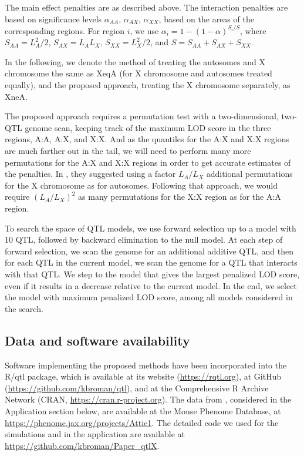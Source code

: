 \documentclass[12pt,letterpaper]{article}
\begin{document}
The main effect penalties are as described above. The interaction
penalties are based on significance levels $\alpha_{AA}$,
$\alpha_{AX}$, $\alpha_{XX}$, based on the areas of the corresponding
regions. For region $i$, we use $\alpha_i = 1 - (1-\alpha)^{S_i/S}$,
where $S_{AA} = L_A^2/2$, $S_{AX} = L_AL_X$, $S_{XX} = L_X^2/2$, and
$S = S_{AA} + S_{AX} + S_{XX}$.

In the following, we denote the method of \citet{Manichaikul2009}
treating the autosomes and X chromosome the same as XeqA (for X
chromosome and autosomes treated equally), and the proposed approach,
treating the X chromosome separately, as XneA.

The proposed approach requires a permutation test with a
two-dimensional, two-QTL genome scan, keeping track of the maximum LOD
score in the three regions, A:A, A:X, and X:X. And as the quantiles
for the A:X and X:X regions are much farther out in the tail, we will
need to perform many more permutations for the A:X and X:X regions in
order to get accurate estimates of the penalties. In
\citet{Broman2006}, they suggested using a factor $L_A/L_X$ additional
permutations for the X chromosome as for autosomes. Following that
approach, we would require $(L_A/L_X)^2$ as many permutations for the
X:X region as for the A:A region.

To search the space of QTL models, we use forward selection up to a
model with 10 QTL, followed by backward elimination to
the null model. At each step of forward selection, we scan the genome
for an additional additive QTL, and then for each QTL in the current
model, we scan the genome for a QTL that interacts with that QTL. We
step to the model that gives the largest penalized LOD score, even if
it results in a decrease relative to the current model. In the end, we
select the model with maximum penalized LOD score, among all models
considered in the search.

\subsection*{Data and software availability}

Software implementing the proposed methods have been incorporated into
the R/qtl package, which is available at its website
(\url{https://rqtl.org}), at GitHub
(\url{https://github.com/kbroman/qtl}), and at the Comprehensive R
Archive Network (CRAN, \url{https://cran.r-project.org}).
The data from \citet{Tian2016}, considered in the Application section
below, are available at
the Mouse Phenome Database, at
\url{https://phenome.jax.org/projects/Attie1}.
The detailed code we used for the simulations and in the application
are available at \url{https://github.com/kbroman/Paper_qtlX}.
\end{document}
